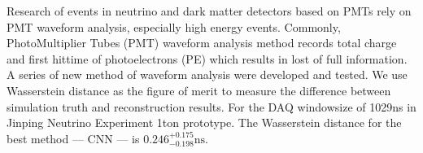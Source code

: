 Research of events in neutrino and dark matter detectors based on PMTs rely on PMT waveform analysis, especially high energy events. Commonly, PhotoMultiplier Tubes (PMT) waveform analysis method records total charge and first hittime of photoelectrons (PE) which results in lost of full information. A series of new method of waveform analysis were developed and tested. We use Wasserstein distance as the figure of merit to measure the difference between simulation truth and reconstruction results. For the DAQ windowsize of 1029ns in Jinping Neutrino Experiment 1ton prototype. The Wasserstein distance for the best method --- CNN --- is $0.246^{+0.175}_{-0.198}\mathrm{ns}$. 